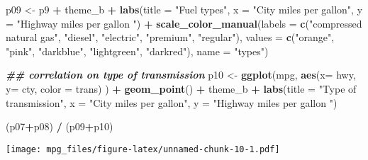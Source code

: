 \documentclass[
]{article}
\newenvironment{Shaded}{\begin{snugshade}}{\end{snugshade}}
\newcommand{\AttributeTok}[1]{\textcolor[rgb]{0.13,0.29,0.53}{#1}}
\newcommand{\DocumentationTok}[1]{\textcolor[rgb]{0.56,0.35,0.01}{\textbf{\textit{#1}}}}
\newcommand{\FunctionTok}[1]{\textcolor[rgb]{0.13,0.29,0.53}{\textbf{#1}}}
\newcommand{\NormalTok}[1]{#1}
\newcommand{\OtherTok}[1]{\textcolor[rgb]{0.56,0.35,0.01}{#1}}
\newcommand{\SpecialCharTok}[1]{\textcolor[rgb]{0.81,0.36,0.00}{\textbf{#1}}}
\newcommand{\StringTok}[1]{\textcolor[rgb]{0.31,0.60,0.02}{#1}}
\begin{document}
\begin{Shaded}
\begin{Highlighting}[]
\NormalTok{p09 }\OtherTok{\textless{}{-}}
\NormalTok{  p9 }\SpecialCharTok{+}\NormalTok{ theme\_b }\SpecialCharTok{+}
  \FunctionTok{labs}\NormalTok{(}\AttributeTok{title =} \StringTok{"Fuel types"}\NormalTok{,}
       \AttributeTok{x =} \StringTok{"City miles per gallon"}\NormalTok{,}
       \AttributeTok{y =} \StringTok{"Highway miles per gallon "}\NormalTok{) }\SpecialCharTok{+}
  \FunctionTok{scale\_color\_manual}\NormalTok{(}\AttributeTok{labels =} \FunctionTok{c}\NormalTok{(}\StringTok{"compressed natural gas"}\NormalTok{, }\StringTok{"diesel"}\NormalTok{, }\StringTok{"electric"}\NormalTok{, }\StringTok{"premium"}\NormalTok{, }\StringTok{"regular"}\NormalTok{), }
                     \AttributeTok{values =} \FunctionTok{c}\NormalTok{(}\StringTok{"orange"}\NormalTok{, }\StringTok{"pink"}\NormalTok{, }\StringTok{"darkblue"}\NormalTok{, }\StringTok{"lightgreen"}\NormalTok{, }\StringTok{"darkred"}\NormalTok{),}
                     \AttributeTok{name =} \StringTok{"types"}\NormalTok{)}

\DocumentationTok{\#\# correlation on type of transmission}
\NormalTok{p10 }\OtherTok{\textless{}{-}} \FunctionTok{ggplot}\NormalTok{(mpg, }\FunctionTok{aes}\NormalTok{(}\AttributeTok{x=}\NormalTok{ hwy, }\AttributeTok{y=}\NormalTok{ cty, }\AttributeTok{color =}\NormalTok{ trans) ) }\SpecialCharTok{+}
  \FunctionTok{geom\_point}\NormalTok{() }\SpecialCharTok{+}\NormalTok{ theme\_b }\SpecialCharTok{+}
  \FunctionTok{labs}\NormalTok{(}\AttributeTok{title =} \StringTok{"Type of transmission"}\NormalTok{,}
       \AttributeTok{x =} \StringTok{"City miles per gallon"}\NormalTok{,}
       \AttributeTok{y =} \StringTok{"Highway miles per gallon "}\NormalTok{)}
\end{Highlighting}
\end{Shaded}

\begin{Shaded}
\begin{Highlighting}[]
\NormalTok{(p07}\SpecialCharTok{+}\NormalTok{p08) }\SpecialCharTok{/}\NormalTok{ (p09}\SpecialCharTok{+}\NormalTok{p10)}
\end{Highlighting}
\end{Shaded}

\texttt{[image: mpg\_files/figure-latex/unnamed-chunk-10-1.pdf]}
\end{document}
